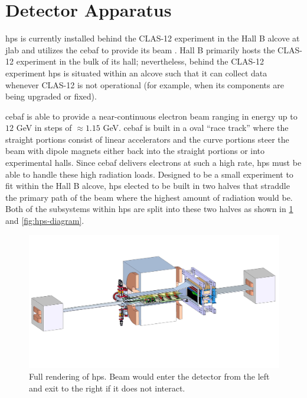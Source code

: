 \section{Detector Apparatus}
\ac{hps} is currently installed behind the CLAS-12 experiment in the Hall B
alcove at \ac{jlab} and utilizes the \ac{cebaf} to provide its beam
\cite{mrsolt-thesis-2020,skmccarty-thesis-2020}.
Hall B primarily hosts the CLAS-12 experiment in the bulk of its hall; nevertheless,
behind the CLAS-12 experiment \ac{hps} is situated
within an alcove such that it can collect data whenever CLAS-12 is not operational (for example,
when its components are being upgraded or fixed).

\ac{cebaf} \cite{cebaf-12GeV-2012,cebaf-opportunities-2012,cebaf-2013} is able to
provide a near-continuous electron beam ranging in energy up to $12$ GeV in steps
of $\approx 1.15$ GeV. \ac{cebaf} is built in a oval ``race track'' where the straight
portions consist of linear accelerators and the curve portions steer the beam with
dipole magnets either back into the straight portions or into experimental halls.
Since \ac{cebaf} delivers electrons at such a high rate, \ac{hps} must be able to
handle these high radiation loads. Designed to be a small experiment to fit within
the Hall B alcove, \ac{hps} elected to be built in two halves that straddle the primary
path of the beam where the highest amount of radiation would be. Both of the subsystems
within \ac{hps} are split into these two halves as shown in \cref{fig:hps-full-render}
and \cref{fig:hps-diagram}.

\begin{figure}
  \centering
  \includegraphics[trim={15cm 10cm 10cm 5cm},clip,width=\textwidth]{figures/hps/experiment/hps_full_render.jpg}
  \caption{
    Full rendering of \ac{hps}.
    Beam would enter the detector from the left and exit to the right if it does not interact.
  }
  \label{fig:hps-full-render}
\end{figure}

